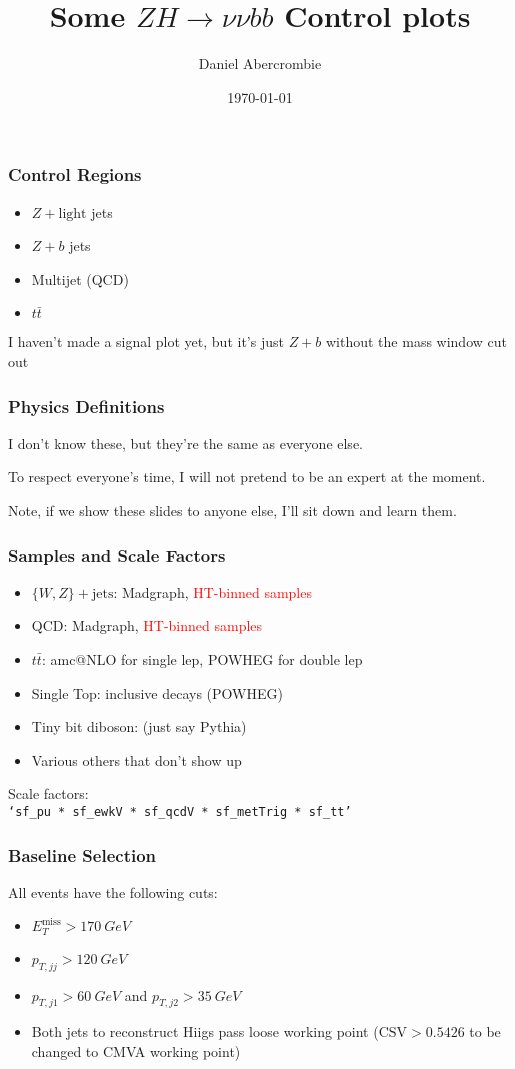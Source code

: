 \documentclass{beamer}
\author[D. Abercrombie]{
  Daniel Abercrombie
}
\title{\bf \sffamily Some $ZH \rightarrow \nu\nu bb$ Control plots}
\date{\today}
\newcommand{\ttbar}{\ensuremath{t\bar{t}}}
\newcommand{\MET}{\ensuremath{E_{T}^{\mathrm{miss}}}}
\begin{document}
\begin{frame}[nonumbering]
  \titlepage
\end{frame}

\begin{frame}
  \frametitle{Control Regions}
  \begin{itemize}
  \item $Z + \mathrm{light}$ jets
  \item $Z + b$ jets
  \item Multijet (QCD)
  \item \ttbar
  \end{itemize}
  I haven't made a signal plot yet,
  but it's just $Z + b$ without the mass window cut out
\end{frame}

\begin{frame}
  \frametitle{Physics Definitions}
  I don't know these, but they're the same as everyone else.

  \vspace{12pt}

  To respect everyone's time, I will not pretend to be an expert at the moment.

  \vspace{12pt}

  Note, if we show these slides to anyone else, I'll sit down and learn them.
\end{frame}

\begin{frame}
  \frametitle{Samples and Scale Factors}
  \begin{itemize}
  \item $\{W,Z\} + \mathrm{jets}$: Madgraph, \textcolor{red}{HT-binned samples}
  \item QCD: Madgraph, \textcolor{red}{HT-binned samples}
  \item \ttbar: amc@NLO for single lep, POWHEG for double lep
  \item Single Top: inclusive decays (POWHEG)
  \item Tiny bit diboson: (just say Pythia)
  \item Various others that don't show up
  \end{itemize}

  Scale factors: \\ \centering \tt{`sf\_pu * sf\_ewkV * sf\_qcdV * sf\_metTrig * sf\_tt'}
\end{frame}

\begin{frame}
  \frametitle{Baseline Selection}
  All events have the following cuts:

  \begin{itemize}
  \item $\MET > \SI{170}{GeV}$
  \item $p_{T, jj} > \SI{120}{GeV}$
  \item $p_{T, j1} > \SI{60}{GeV}$ and $p_{T, j2} > \SI{35}{GeV}$
  \item Both jets to reconstruct Hiigs pass loose working point
    ($\mathrm{CSV} > 0.5426$ to be changed to CMVA working point)
  \end{itemize}
\end{frame}
\end{document}
